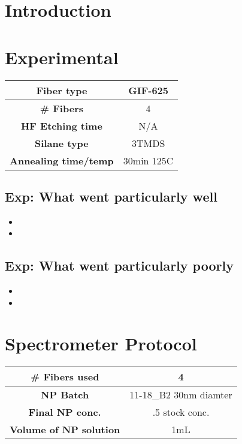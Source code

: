 \section{Introduction}

\section{Experimental}


\begin{center}
\begin{tabular}{| c | c |}
 \hline
 {\bf Fiber type} & GIF-625 \\ \hline
 {\bf \# Fibers} & 4  \\ \hline
 {\bf HF Etching time} & N/A \\ \hline
 {\bf Silane type} & 3TMDS \\ \hline
 {\bf Annealing time/temp} & 30min 125C  \\ \hline
\end{tabular}
\end{center}

\vspace{.2cm}


\subsection{Exp: {\color{blue} What went particularly well}}

\begin{itemize}
\item{}
\item{}
\end{itemize}

\subsection{Exp: {\color{red} What went particularly poorly}}

\begin{itemize}
\item{}
\item{}
\end{itemize}

\section{Spectrometer Protocol}

\begin{center}
\begin{tabular}{| c | c |}
 \hline
 {\bf \# Fibers used} & 4 \\ \hline
 {\bf NP Batch} & 11-18\_B2 30nm diamter \\ \hline
 {\bf Final NP conc.} & .5 stock conc.  \\ \hline
 {\bf Volume of NP solution} & 1mL \\ \hline
\end{tabular}
\end{center}

